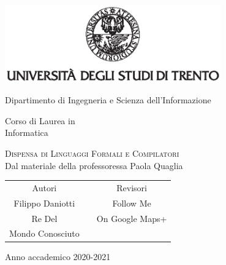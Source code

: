 \documentclass[class=book, crop=false, oneside]{standalone}
\begin{document}
\begin{titlepage}
	\centering
	\includegraphics[width=0.7\textwidth, keepaspectratio]{logo-unitn.eps}

	\vspace{1.4cm}
	\LARGE{Dipartimento di Ingegneria e Scienza dell'Informazione\\}

	\vspace{.9cm}
	\Large{Corso di Laurea in\\ Informatica}

	\vspace{1cm}
	\Huge\textsc{Dispensa di Linguaggi Formali e Compilatori\\}
	\large{Dal materiale della professoressa Paola Quaglia}

	\vspace{2cm}
	\begin{tabularx}{\textwidth}{cXc}
		\Large{Autori} & & \Large{Revisori}\\
		\cmidrule(lr){1-1} \cmidrule(lr){3-3}
		\large{Filippo Daniotti} & & \large{Follow Me}\\
		\large{Re Del} & & \large{On Google Maps+}\\
		\large{Mondo Conosciuto} & & \\
	\end{tabularx}

	\vspace{1.6cm}
	\LARGE{Anno accademico 2020-2021}
\end{titlepage}
\end{document}

